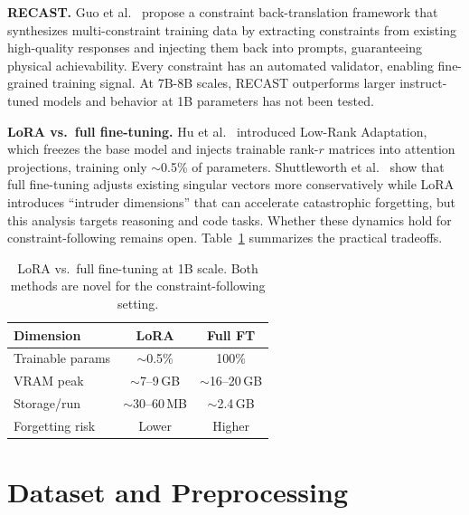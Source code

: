 \documentclass[10pt]{article}
\begin{document}
\textbf{RECAST.}
Guo et al.~\cite{guo2025recast} propose a constraint back-translation
framework that synthesizes multi-constraint training data by extracting
constraints from existing high-quality responses and injecting them back
into prompts, guaranteeing physical achievability. Every constraint has an
automated validator, enabling fine-grained training signal. At 7B-8B
scales, RECAST outperforms larger instruct-tuned models and behavior at 1B
parameters has not been tested.

\textbf{LoRA vs.\ full fine-tuning.}
Hu et al.~\cite{hu2022lora} introduced Low-Rank Adaptation, which freezes
the base model and injects trainable rank-$r$ matrices into attention
projections, training only $\sim$0.5\% of parameters. Shuttleworth et
al.~\cite{shuttleworth2024lora} show that full fine-tuning adjusts existing
singular vectors more conservatively while LoRA introduces ``intruder
dimensions'' that can accelerate catastrophic forgetting, but this
analysis targets reasoning and code tasks. Whether these dynamics hold for
constraint-following remains open. Table~\ref{tab:lora_vs_ft} summarizes
the practical tradeoffs.

\begin{table}[H]
\centering
\caption{LoRA vs.\ full fine-tuning at 1B scale. Both methods are
novel for the constraint-following setting.}
\label{tab:lora_vs_ft}
\small
\begin{tabular}{lcc}
\toprule
\textbf{Dimension} & \textbf{LoRA} & \textbf{Full FT} \\
\midrule
Trainable params  & $\sim$0.5\%      & 100\%           \\
VRAM peak         & $\sim$7--9\,GB   & $\sim$16--20\,GB \\
Storage/run       & $\sim$30--60\,MB & $\sim$2.4\,GB   \\
Forgetting risk   & Lower            & Higher          \\
\bottomrule
\end{tabular}
\end{table}



\section{Dataset and Preprocessing}
\end{document}
